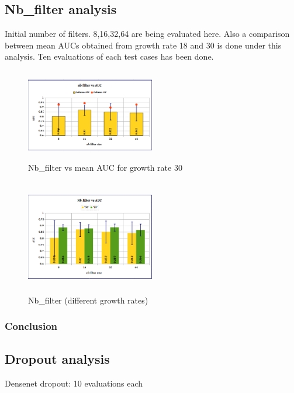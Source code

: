\subsection{Nb\_filter analysis}
Initial number of filters. 8,16,32,64 are being evaluated here. Also a comparison between mean AUCs obtained from growth rate 18 and 30 is done under this analysis. Ten evaluations of each test cases has been done.
\begin{figure}[h]
\centering
\includegraphics[height=4cm,width=0.5\textwidth]{images/densenet/nb_filter_vs_auc}
\caption{Nb\_filter vs mean AUC for growth rate 30}
\label{fig:nb_filter_vs_auc}
\end{figure}

\begin{figure}[h]
\centering
\includegraphics[height=5cm,width=0.5\textwidth]{images/densenet/nb_filter_vs_auc_growthrate_compare}
\caption{Nb\_filter (different growth rates)}
\label{fig:nb_filter_vs_auc_growthrate_compare}
\end{figure}

\subsubsection{Conclusion}

\subsection{Dropout analysis}
Densenet dropout: 10 evaluations each \\


